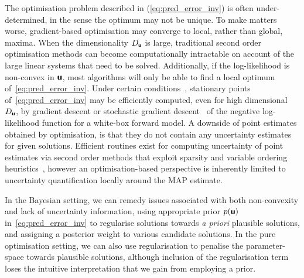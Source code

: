The optimisation problem described in (\ref{eq:pred_error_inv}) is often under-determined, in the sense the optimum may not be unique. 
To make matters worse, gradient-based optimisation may converge to local, rather than global, maxima.
When the dimensionality $D_{\boldsymbol{\mathsf{u}}}$ is large, traditional second order optimisation methods can become computationally intractable on account of the large linear systems that need to be solved.
Additionally, if the log-likelihood is non-convex in $\boldsymbol{\mathsf{u}}$, most algorithms will only be able to find a local optimum of~\eqref{eq:pred_error_inv}.
Under certain conditions~\citep[Chapter 5]{WrightOptimization2021}, stationary points of~\eqref{eq:pred_error_inv} may be efficiently computed, even for high dimensional $D_{\boldsymbol{\mathsf{u}}}$, by gradient descent or stochastic gradient descent~\citep{XuADCME2020,MacKinlayModel2021} of the negative log-likelihood function for a white-box forward model.
A downside of point estimates obtained by optimisation, is that they do not contain any uncertainty estimates for given solutions.
Efficient routines exist for computing uncertainty of point estimates via second order methods that exploit sparsity and variable ordering heuristics~\citep{DellaertFactor2017}, however an optimisation-based perspective is inherently limited to uncertainty quantification locally around the MAP estimate.

In the Bayesian setting, we can remedy issues associated with both non-convexity and lack of uncertainty information, using appropriate prior $p(\boldsymbol{\mathsf{u}})$ in~\eqref{eq:pred_error_inv} to regularise solutions towards \emph{a priori} plausible solutions, and assigning a posterior weight to various candidate solutions.
In the pure optimisation setting, we can also use regularisation to penalise the parameter-space towards plausible solutions, although inclusion of the regularisation term loses the intuitive interpretation that we gain from employing a prior.

